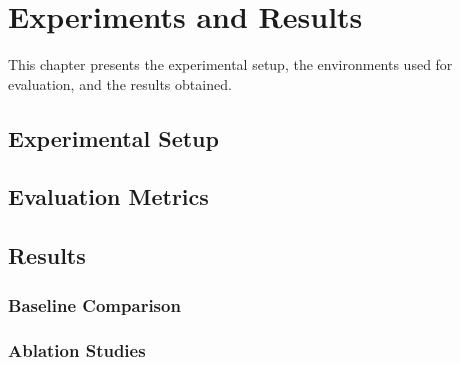 \section{Experiments and Results}
\label{ch:experiments}

This chapter presents the experimental setup, the environments used for evaluation, and the results obtained.

\subsection{Experimental Setup}

\subsection{Evaluation Metrics}

\subsection{Results}
\subsubsection{Baseline Comparison}
\subsubsection{Ablation Studies}
